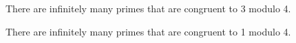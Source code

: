 \begin{frame}{}
  \begin{Theorem}
    There are infinitely many primes that are congruent to 3 modulo 4.
  \end{Theorem}

  \pause

  \begin{Theorem}
    There are infinitely many primes that are congruent to 1 modulo 4.
  \end{Theorem}
\end{frame}
